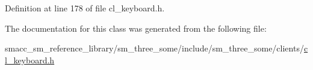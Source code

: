 Definition at line 178 of file cl\+\_\+keyboard.\+h.



The documentation for this class was generated from the following file\+:\begin{DoxyCompactItemize}
\item 
smacc\+\_\+sm\+\_\+reference\+\_\+library/sm\+\_\+three\+\_\+some/include/sm\+\_\+three\+\_\+some/clients/\hyperlink{cl__keyboard_8h}{cl\+\_\+keyboard.\+h}\end{DoxyCompactItemize}
